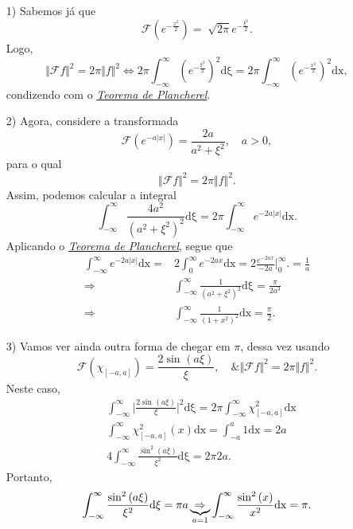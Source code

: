 \documentclass[../pde_notes.tex]{subfiles}
\begin{document}
\begin{example}
	\begin{itemize}
		\item[1)] Sabemos já que
		      \[
			      \mathcal{F}(e^{-\frac{x^{2}}{2}}) = \sqrt[]{2\pi }e^{-\frac{\xi^{2}}{2}}.
		      \]
		      Logo,
		      \[
			      \Vert \mathcal{F}f \Vert^{2} = 2\pi \Vert f \Vert^{2} \Longleftrightarrow 2\pi \int_{-\infty}^{\infty}(e^{-\frac{\xi^{2}}{2}})^{2} \mathrm{d\xi }=2\pi \int_{-\infty}^{\infty}(e^{-\frac{x^{2}}{2}})^{2} \mathrm{dx},
		      \]
		      condizendo com o \hyperlink{parseval_plancherel}{\textit{Teorema de Plancherel}}.
		\item[2)] Agora, considere a transformada
		      \[
			      \mathcal{F}(e^{-a|x|}) = \frac{2a}{a^{2}+\xi^{2}},\quad a > 0,
		      \]
		      para o qual
		      \[
			      \Vert \mathcal{F}f \Vert^{2} = 2\pi \Vert f \Vert^{2}.
		      \]
		      Assim, podemos calcular a integral
		      \[
			      \int_{-\infty}^{\infty}\frac{4a^{2}}{(a^{2}+\xi^{2})^{2}} \mathrm{d\xi } = 2\pi \int_{-\infty}^{\infty}e^{-2a|x|} \mathrm{dx}.
		      \]
		      Aplicando o \hyperlink{parseval_plancherel}{\textit{Teorema de Plancherel}}, segue que
		      \begin{align*}
			      \int_{-\infty}^{\infty}e^{-2a|x|} \mathrm{dx} = & 2\int_{0}^{\infty}e^{-2ax} \mathrm{dx} = 2 \frac{e^{-2ax}}{-2a}\biggl|_{0}^{\infty}\biggr. = \frac{1}{a} \\
			      \Rightarrow                                     & \int_{-\infty}^{\infty}\frac{1}{(a^{2}+\xi^{2})^{2}} \mathrm{d\xi } = \frac{\pi }{2a^{3}}                \\
			      \Rightarrow                                     & \int_{-\infty}^{\infty}\frac{1}{(1+x^{2})^{2}} \mathrm{dx} = \frac{\pi }{2}.
		      \end{align*}
		\item[3)] Vamos ver ainda outra forma de chegar em \(\pi \), dessa vez usando
		      \[
			      \mathcal{F}(\chi_{[-a, a]}) = \frac{2\sin^{}{(a\xi )}}{\xi },\quad \& \Vert \mathcal{F}f \Vert^{2} = 2\pi \Vert f \Vert^{2}.
		      \]
		      Neste caso,
		      \begin{align*}
			       & \int_{-\infty}^{\infty}\biggl\vert \frac{2\sin^{}{(a\xi )}}{\xi } \biggr\vert^{2} \mathrm{d\xi }=2\pi \int_{-\infty}^{\infty}\chi_{[-a, a]}^{2} \mathrm{dx} \\
			       & \int_{-\infty}^{\infty}\chi_{[-a, a]}^{2}(x) \mathrm{dx} = \int_{-a}^{a}1 \mathrm{dx} = 2a                                                                  \\
			       & 4 \int_{-\infty}^{\infty}\frac{\sin^{2}{(a\xi )}}{\xi^{2}} \mathrm{d\xi } = 2\pi 2a.
		      \end{align*}
		      Portanto,
		      \[
			      \int_{-\infty}^{\infty}\frac{\sin^{2}{(a\xi )}}{\xi^{2}} \mathrm{d\xi } = \pi a \underbrace{\Rightarrow }_{\mathclap{a=1}} \int_{-\infty}^{\infty}\frac{\sin^{2}{(x)}}{x^{2}} \mathrm{dx}=\pi .
		      \]
	\end{itemize}
\end{example}
\end{document}
